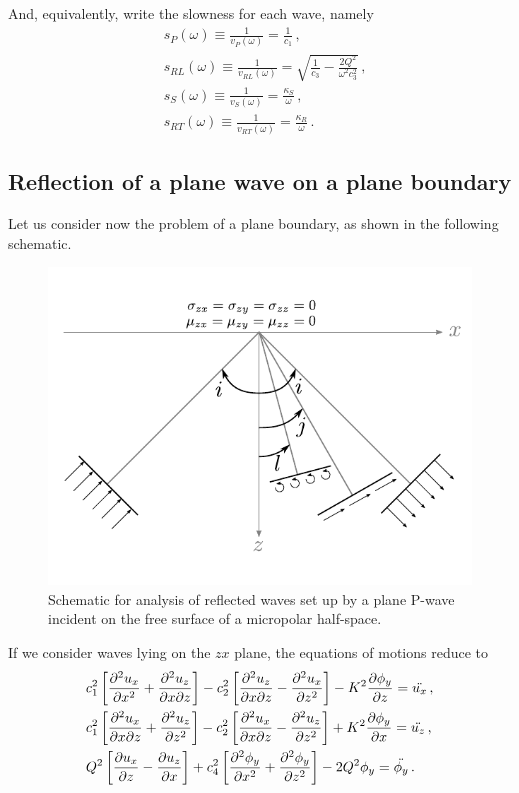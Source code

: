 \documentclass[12pt]{article}
\begin{document}
And, equivalently, write the slowness for each wave, namely
\begin{align}
&s_P(\omega) \equiv \frac{1}{v_P(\omega)} = \frac{1}{c_1}\, ,\\
&s_{RL}(\omega) \equiv \frac{1}{v_{RL}(\omega)} = \sqrt{\frac{1}{c_3} - \frac{2Q^2}{\omega^2 c_3^2}}\, ,\\
&s_S(\omega)\equiv \frac{1}{v_S(\omega)} = \frac{\kappa_S}{\omega}\, ,\\
&s_{RT}(\omega) \equiv \frac{1}{v_{RT}(\omega)} = \frac{\kappa_R}{\omega}\, .
\end{align}

\subsection{Reflection of a plane wave on a plane boundary}
Let us consider now the problem of a plane boundary, as shown in the following schematic.
\begin{figure}[h]
  \centering
  \includegraphics[scale=1]{img/reflection_schematic.pdf}
  \caption{Schematic for analysis of reflected waves set up by a plane P-wave incident on the free surface of a micropolar half-space.}
  \label{fig:reflection_schematic}
\end{figure}

If we consider waves lying on the \(zx\) plane, the equations of motions reduce to
\begin{align*}
&c_1^2\left[\pdv[2]{u_x}{x} + \pdv{u_z}{x}{z}\right] - c_2^2\left[\pdv{u_z}{x}{z} - \pdv[2]{u_x}{z}\right] - K^2\pdv{\phi_y}{z} = \ddot{u_x}\, ,\\
&c_1^2\left[\pdv{u_x}{x}{z} + \pdv[2]{u_z}{z}\right] - c_2^2\left[\pdv{u_x}{x}{z} - \pdv[2]{u_z}{z}\right] + K^2\pdv{\phi_y}{x} = \ddot{u_z}\, ,\\
&Q^2\left[\pdv{u_x}{z} - \pdv{u_z}{x}\right] + c_4^2\left[\pdv[2]{\phi_y}{x} + \pdv[2]{\phi_y}{z}\right] - 2Q^2\phi_y = \ddot{\phi_y}\, .
\end{align*}
\end{document}

